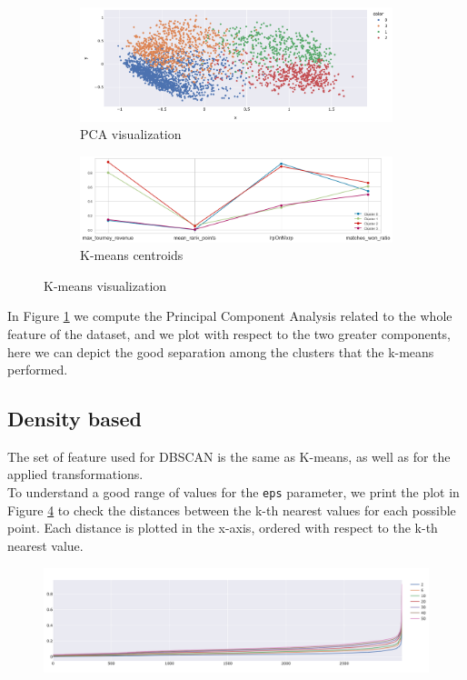 \begin{figure}[h]
	\centering
  \begin{subfigure}[b]{0.48\textwidth}
		\includegraphics[width=\textwidth]{plots/kmeans/scatter_pca.png}
		\caption{PCA visualization}
		\label{fig:pca_visualization}
  \end{subfigure}
  \begin{subfigure}[b]{0.48\textwidth}
		\includegraphics[width=\textwidth]{plots/kmeans/centers_plot.png}
		\caption{K-means centroids}
		\label{fig:kmeans_centroid}
  \end{subfigure}
	\caption{K-means visualization}
\end{figure}
In Figure \ref{fig:pca_visualization} we compute the Principal Component Analysis related to the whole feature of the dataset, and we plot with respect to the two greater components, here we can depict the good separation among the clusters that the k-means performed.

\subsection{Density based}
The set of feature used for DBSCAN is the same as K-means, as well as for the applied transformations.\\
To understand a good range of values for the \verb|eps| parameter, we print the plot in Figure \ref{fig:dbscan_distances} to check the distances between the k-th nearest values for each possible point. Each distance is plotted in the x-axis, ordered with respect to the k-th nearest value.
\begin{figure}[h]
	\centering
	\includegraphics[width=\textwidth]{plots/dbscan/dbscan_distances}
	\label{fig:dbscan_distances}
\end{figure}

